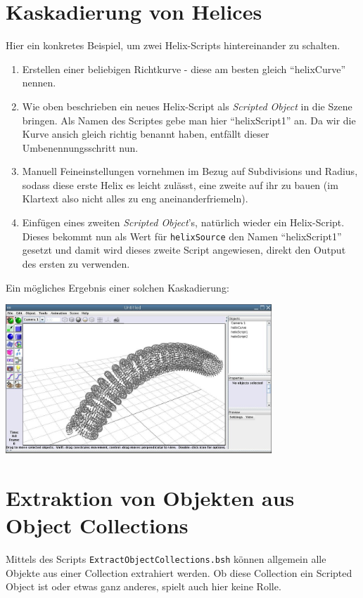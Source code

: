 \documentclass[12pt,a4paper]{scrartcl}
\begin{document}
\section{Kaskadierung von Helices}
Hier ein konkretes Beispiel, um zwei Helix-Scripts hintereinander
zu schalten.

\begin{enumerate}
	\item Erstellen einer beliebigen Richtkurve - diese am besten
		gleich ``helixCurve'' nennen.
	\item Wie oben beschrieben ein neues Helix-Script als
		\emph{Scripted Object} in die Szene bringen. Als Namen des Scriptes 
		gebe man hier ``helixScript1'' an. Da wir die Kurve ansich
		gleich richtig benannt haben, entfällt dieser Umbenennungsschritt
		nun. 
	\item Manuell Feineinstellungen vornehmen im Bezug auf Subdivisions
		und Radius, sodass diese erste Helix es leicht zulässt, eine
		zweite auf ihr zu bauen (im Klartext also nicht alles zu eng
		aneinanderfriemeln).
	\item Einfügen eines zweiten \emph{Scripted Object}'s, natürlich
		wieder ein Helix-Script. Dieses bekommt nun als Wert für
		\texttt{helixSource} den Namen ``helixScript1'' gesetzt und
		damit wird dieses zweite Script angewiesen, direkt den Output
		des ersten zu verwenden.
\end{enumerate}

Ein mögliches Ergebnis einer solchen Kaskadierung:
\begin{center}
	\includegraphics[width=0.75\textwidth]{../pics/doubleHelix.jpg}
\end{center}

\section{Extraktion von Objekten aus Object Collections}
Mittels des Scripts \texttt{ExtractObjectCollections.bsh} können
allgemein alle Objekte aus einer Collection extrahiert werden. Ob
diese Collection ein Scripted Object ist oder etwas ganz anderes,
spielt auch hier keine Rolle.
\end{document}
